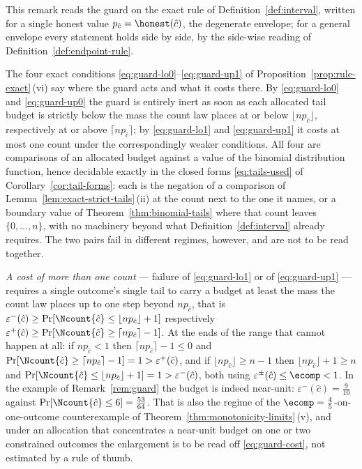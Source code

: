 \begin{remark}\label{rem:guard-activation}
This remark reads the guard on the exact rule of
Definition~\ref{def:interval}, written for a single honest value
$p_{\hat c}=\honest(\hat c)$, the degenerate envelope; for a general envelope
every statement holds side by side, by the side-wise reading of
Definition~\ref{def:endpoint-rule}.

The four exact conditions \eqref{eq:guard-lo0}--\eqref{eq:guard-up1} of
Proposition~\ref{prop:rule-exact}\,(vi) say where the guard acts and what it
costs there. By \eqref{eq:guard-lo0} and \eqref{eq:guard-up0} the guard is
entirely inert as soon as each allocated tail budget is strictly below the
mass the count law places at or below $\lfloor np_{\hat c}\rfloor$,
respectively at or above $\lceil np_{\hat c}\rceil$; by \eqref{eq:guard-lo1}
and \eqref{eq:guard-up1} it costs at most one count under the correspondingly
weaker conditions. All four are comparisons of an allocated budget against a
value of the binomial distribution function, hence decidable exactly in the
closed forms \eqref{eq:tails-used} of Corollary~\ref{cor:tail-forms}: each
is the negation of a comparison of Lemma~\ref{lem:exact-strict-tails}\,(ii)
at the count next to the one it names, or a boundary value of
Theorem~\ref{thm:binomial-tails} where that count leaves $\{0,\dots,n\}$,
with no machinery beyond what
Definition~\ref{def:interval} already requires. The two
pairs fail in different regimes, however, and are not to be read together.

\emph{A cost of more than one count} --- failure of \eqref{eq:guard-lo1} or of
\eqref{eq:guard-up1} --- requires a single outcome's single tail to carry a
budget at least the mass the count law places up to one step beyond
$np_{\hat c}$, that is
$\varepsilon^{-}(\hat c)\ge\Pr[\Ncount{\hat c}\le\lfloor np_{\hat c}\rfloor+1]$
respectively
$\varepsilon^{+}(\hat c)\ge\Pr[\Ncount{\hat c}\ge\lceil np_{\hat c}\rceil-1]$.
At the ends of the range that cannot happen at all: if $np_{\hat c}<1$ then
$\lceil np_{\hat c}\rceil-1\le0$ and
$\Pr[\Ncount{\hat c}\ge\lceil np_{\hat c}\rceil-1]=1>\varepsilon^{+}(\hat c)$,
and if $\lfloor np_{\hat c}\rfloor\ge n-1$ then
$\lfloor np_{\hat c}\rfloor+1\ge n$ and
$\Pr[\Ncount{\hat c}\le\lfloor np_{\hat c}\rfloor+1]=1>\varepsilon^{-}(\hat
c)$, both using $\varepsilon^{\pm}(\hat c)\le\ecomp<1$. In the example of
Remark~\ref{rem:guard} the budget is indeed near-unit: $\varepsilon^{-}(\hat
c)=\tfrac9{10}$ against $\Pr[\Ncount{\hat c}\le6]=\tfrac{53}{64}$. That is
also the regime of the $\ecomp=\tfrac45$-on-one-outcome counterexample of
Theorem~\ref{thm:monotonicity-limits}\,(v), and under an allocation that concentrates a
near-unit budget on one or two constrained outcomes the enlargement is to be
read off \eqref{eq:guard-cost}, not estimated by a rule of thumb.


\end{remark}
